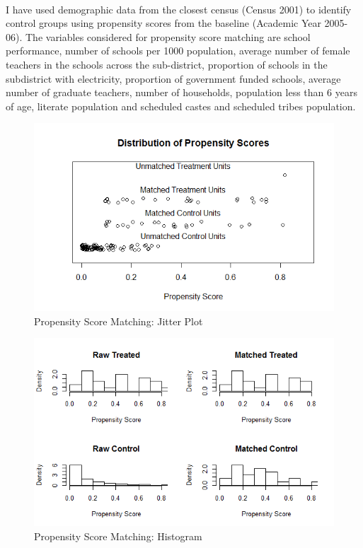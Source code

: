 \documentclass[12pt, a4paper]{article}
\begin{document}
\paragraph{} I have used demographic data from the closest census (Census 2001) to identify control groups using propensity scores from the baseline (Academic Year 2005-06). The variables considered for propensity score matching are school performance, number of schools per 1000 population, average number of female teachers in the schools across the sub-district, proportion of schools in the subdistrict with electricity, proportion of government funded schools, average number of graduate teachers, number of households, population less than 6 years of age, literate population and scheduled castes and scheduled tribes population. 

\begin{figure}[h!]
	\centering
	\includegraphics[scale = 0.85]{Jitter}
	\caption{Propensity Score Matching: Jitter Plot}
	\label{Fig1}
\end{figure}

\begin{figure}[h!]
	\centering
	\includegraphics[scale = 0.85]{PSMatch}
	\caption{Propensity Score Matching: Histogram}
	\label{Fig2}
\end{figure}
\end{document}
